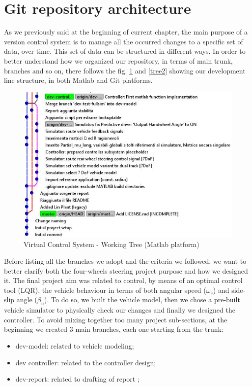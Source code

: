\section{Git repository architecture}
As we previously said at the beginning of current chapter, the main purpose of a version control system is to manage all the occurred changes to a specific set of data, over time. This set of data can be structured in different ways. In order to better understand how we organized our repository, in terms of main trunk, branches and so on, there follows the fig. \ref{tree1} and \ref{tree2} showing our development line structure, in both Matlab and Git platforms.
\begin{figure}
	\centering
	\includegraphics[scale=0.6]{../Images/VCS/VCS_tree.JPG}
	\caption{Virtual Control System - Working Tree (Matlab platform)}
	\label{tree1}
\end{figure}
Before listing all the branches we adopt and the criteria we followed, we want to better clarify both the four-wheels steering project purpose and how we designed it. The final project aim was related to control, by means of an optimal control tool (LQR), the vehicle behaviour in terms of both angular speed ($\omega_{z}$) and side-slip angle ($\beta_{u}$). To do so, we built the vehicle model, then we chose a pre-built vehicle simulator to physically check our changes and finally we designed the controller. To avoid mixing together too many project sub-sections, at the beginning we created 3 main branches, each one starting from the trunk:
\begin{itemize}
	\item dev-model: related to vehicle modeling;
	\item dev controller: related to the controller design;
	\item dev-report: related to drafting of report ;
\end{itemize}

